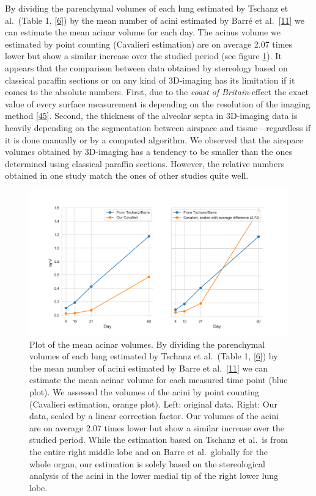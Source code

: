 \documentclass[
  american,
]{article}
\begin{document}
By dividing the parenchymal volumes of each lung estimated by Tschanz et al.~(Table 1, {[}\protect\hyperlink{ref-wnl86DEM}{6}{]}) by the mean number of acini estimated by Barré et al.~{[}\protect\hyperlink{ref-uFNlWogb}{11}{]} we can estimate the mean acinar volume for each day.
The acinus volume we estimated by point counting (Cavalieri estimation) are on average 2.07 times lower but show a similar increase over the studied period (see figure \ref{fig:06}).
It appears that the comparison between data obtained by stereology based on classical paraffin sections or on any kind of 3D-imaging has its limitation if it comes to the absolute numbers.
First, due to the \emph{coast of Britain}-effect the exact value of every surface measurement is depending on the resolution of the imaging method {[}\protect\hyperlink{ref-AdXhaEV4}{45}{]}.
Second, the thickness of the alveolar septa in 3D-imaging data is heavily depending on the segmentation between airspace and tissue---regardless if it is done manually or by a computed algorithm.
We observed that the airspace volumes obtained by 3D-imaging has a tendency to be smaller than the ones determined using classical paraffin sections.
However, the relative numbers obtained in one study match the ones of other studies quite well.

\begin{figure}
\hypertarget{fig:06}{%
\centering
\includegraphics{images/fig06.png}
\caption{Plot of the mean acinar volumes.
By dividing the parenchymal volumes of each lung estimated by Tschanz et al.~(Table 1, {[}\protect\hyperlink{ref-wnl86DEM}{6}{]}) by the mean number of acini estimated by Barre et al.~{[}\protect\hyperlink{ref-uFNlWogb}{11}{]} we can estimate the mean acinar volume for each measured time point (blue plot).
We assessed the volumes of the acini by point counting (Cavalieri estimation, orange plot).
Left: original data.
Right: Our data, scaled by a linear correction factor.
Our volumes of the acini are on average 2.07 times lower but show a similar increase over the studied period.
While the estimation based on Tschanz et al.~is from the entire right middle lobe and on Barre et al.~globally for the whole organ, our estimation is solely based on the stereological analysis of the acini in the lower medial tip of the right lower lung lobe.}\label{fig:06}
}
\end{figure}
\end{document}
